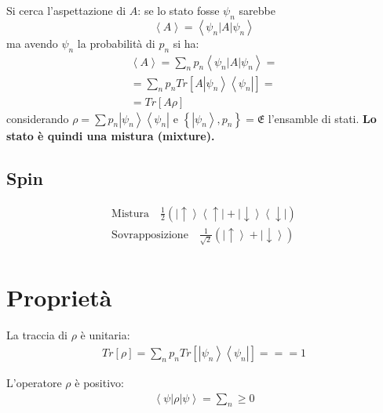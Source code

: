 Si cerca l'aspettazione di $A$: se lo stato fosse $\psi _n$ sarebbe \[\left\langle A \right\rangle=\left\langle \psi _n|A|\psi _n \right\rangle\] ma avendo $\psi _n$ la probabilità di $p_n$ si ha:
\begin{equation}\begin{split}
\left\langle A \right\rangle=\sum_n{p_n\left\langle \psi _n|A|\psi _n \right\rangle}=\\
=\sum_n{p_nTr\left[A\left |\psi _n \right\rangle\left\langle \psi _n\right |\right]} =\\
=Tr\left[A\rho\right]
\end{split}\end{equation}
considerando $\rho=\sum{p_n\left |\psi _n \right\rangle\left\langle \psi _n\right |}$ e $\left\{\left |\psi _n \right\rangle,p_n\right\}=\mathfrak{E}$ l'ensamble di stati. \textbf{Lo stato è quindi una mistura (mixture).}

\subsection{Spin} %
\begin{equation}\begin{split}
\textrm{Mistura} \quad \frac{1}{2}\left(\left |\uparrow \right\rangle\left\langle \uparrow\right |+\left |\downarrow \right\rangle\left\langle \downarrow\right |\right)\\
\textrm{Sovrapposizione} \quad \frac{1}{\sqrt{2}}\left(\left |\uparrow \right\rangle+\left |\downarrow \right\rangle\right)\\
\end{split}\end{equation}

\section{Proprietà} %
La traccia di $\rho$ è unitaria:
\begin{equation}\begin{split}
Tr\left[\rho\right]=\sum_n{p_nTr\left[\left |\psi _n \right\rangle\left\langle \psi _n\right |\right]}= = =1
\end{split}\end{equation}

L'operatore $\rho$ è positivo:
\begin{equation}\begin{split}
\left\langle \psi |\rho|\psi  \right\rangle=\sum_n{}\ge 0
\end{split}\end{equation}

